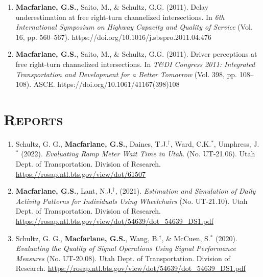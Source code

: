 \documentclass[margin,line]{res}
\newif\ifdetail
\newcounter{enuminitialize}
\newenvironment{myenum}[1][]
{%
 \setcounter{enuminitialize}{#1}
 \addtocounter{enuminitialize}{2}
 \begin{enumerate}[left= 4pt, itemsep=12pt, start=\value{enuminitialize}, label=\arabic*\addtocounter{enumi}{-2}]
}
{%
 \end{enumerate}
}
\newcommand{\secfont}{\scshape }
\begin{document}
\begin{resume}
\begin{myenum}[8]
\item \textbf{Macfarlane, G.S.}, Saito, M., \& Schultz, G.G. (2011). Delay underestimation at free right-turn channelized intersections. In \textit{ 6th International Symposium on Highway Capacity and Quality of Service} (Vol. 16, pp. 560–567). https://doi.org/10.1016/j.sbspro.2011.04.476 \ifdetail Citations: 6  \fi

\item \textbf{Macfarlane, G.S.}, Saito, M., \& Schultz, G.G. (2011). Driver perceptions at free right-turn channelized intersections. In \textit{ T\&DI Congress 2011: Integrated Transportation and Development for a Better Tomorrow} (Vol. 398, pp. 108–108). ASCE. https://doi.org/10.1061/41167(398)108 \ifdetail Citations: 3  \fi
\end{myenum}


\noindent\makebox[\linewidth]{\rule{\linewidth}{0.4pt}}
\section{\secfont Reports}
\ifdetail These are technical reports completed under contract for the sponsoring agency;
each report was reviewed by a technical advisory committee prior to publication. Item 1 resulted from postdoctoral activities at Georgia Tech, items 2 and 3 from my consulting practice, and items 4 through 7 from my work since joining BYU.\fi
\vspace{0.3cm}
\begin{myenum}[7]
\item Schultz, G. G., \textbf{Macfarlane, G.S.}, Daines, T.J.$^\dagger$, Ward, C.K.$^*$, Umphress, J.$^*$ (2022). \textit{Evaluating Ramp Meter Wait Time in Utah}. (No. UT-21.06). Utah Dept. of Transportation. Division of Research. \url{https://rosap.ntl.bts.gov/view/dot/61507}

\item \textbf{Macfarlane, G.S.}, Lant, N.J.$^\dagger$, (2021). \textit{Estimation and Simulation of Daily Activity Patterns for Individuals Using Wheelchairs} (No. UT-21.10). Utah Dept. of Transportation. Division of Research. \url{https://rosap.ntl.bts.gov/view/dot/54639/dot_54639_DS1.pdf}

\item Schultz, G. G., \textbf{Macfarlane, G.S.}, Wang, B.$^\dagger$, \& McCuen, S.$^*$ (2020). \textit{Evaluating the Quality of Signal Operations Using Signal Performance Measures} (No. UT-20.08). Utah Dept. of Transportation. Division of Research. \url{https://rosap.ntl.bts.gov/view/dot/54639/dot_54639_DS1.pdf}


\end{myenum}
\end{resume}
\end{document}
